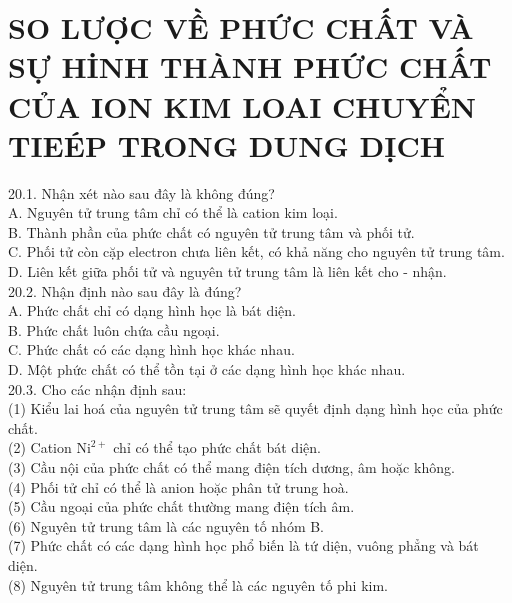 \documentclass[10pt]{article}
\begin{document}
\section*{SO LƯỢC VỀ PHỨC CHẤT VÀ SỰ HİNH THÀNH PHỨC CHẤT CỦA ION KIM LOAI CHUYỂN TIEÉP TRONG DUNG DỊCH}
20.1. Nhận xét nào sau đây là không đúng?\\
A. Nguyên tử trung tâm chỉ có thể là cation kim loại.\\
B. Thành phần của phức chất có nguyên tử trung tâm và phối tử.\\
C. Phối tử còn cặp electron chưa liên kết, có khả năng cho nguyên tử trung tâm.\\
D. Liên kết giữa phối tử và nguyên tử trung tâm là liên kết cho - nhận.\\
20.2. Nhận định nào sau đây là đúng?\\
A. Phức chất chỉ có dạng hình học là bát diện.\\
B. Phức chất luôn chứa cầu ngoại.\\
C. Phức chất có các dạng hình học khác nhau.\\
D. Một phức chất có thể tồn tại ở các dạng hình học khác nhau.\\
20.3. Cho các nhận định sau:\\
(1) Kiểu lai hoá của nguyên tử trung tâm sẽ quyết định dạng hình học của phức chất.\\
(2) Cation $\mathrm{Ni}^{2+}$ chỉ có thể tạo phức chất bát diện.\\
(3) Cầu nội của phức chất có thể mang điện tích dương, âm hoặc không.\\
(4) Phối tử chỉ có thể là anion hoặc phân tử trung hoà.\\
(5) Cầu ngoại của phức chất thường mang điện tích âm.\\
(6) Nguyên tử trung tâm là các nguyên tố nhóm B.\\
(7) Phức chất có các dạng hình học phổ biến là tứ diện, vuông phẳng và bát diện.\\
(8) Nguyên tử trung tâm không thể là các nguyên tố phi kim.
\end{document}
